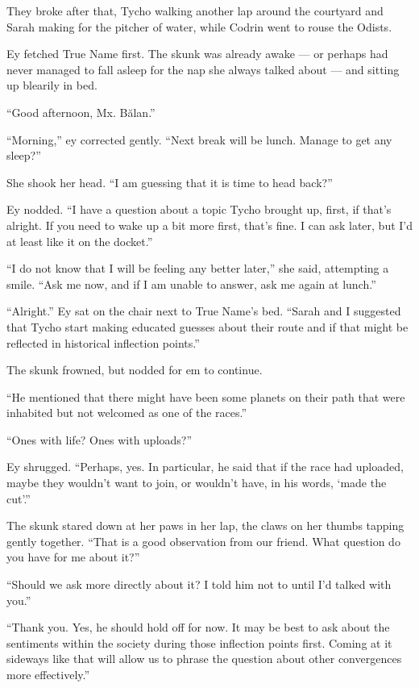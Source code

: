 They broke after that, Tycho walking another lap around the courtyard and Sarah making for the pitcher of water, while Codrin went to rouse the Odists.

Ey fetched True Name first. The skunk was already awake — or perhaps had never managed to fall asleep for the nap she always talked about — and sitting up blearily in bed.

``Good afternoon, Mx. Bălan.''

``Morning,'' ey corrected gently. ``Next break will be lunch. Manage to get any sleep?''

She shook her head. ``I am guessing that it is time to head back?''

Ey nodded. ``I have a question about a topic Tycho brought up, first, if that's alright. If you need to wake up a bit more first, that's fine. I can ask later, but I'd at least like it on the docket.''

``I do not know that I will be feeling any better later,'' she said, attempting a smile. ``Ask me now, and if I am unable to answer, ask me again at lunch.''

``Alright.'' Ey sat on the chair next to True Name's bed. ``Sarah and I suggested that Tycho start making educated guesses about their route and if that might be reflected in historical inflection points.''

The skunk frowned, but nodded for em to continue.

``He mentioned that there might have been some planets on their path that were inhabited but not welcomed as one of the races.''

``Ones with life? Ones with uploads?''

Ey shrugged. ``Perhaps, yes. In particular, he said that if the race had uploaded, maybe they wouldn't want to join, or wouldn't have, in his words, `made the cut'.''

The skunk stared down at her paws in her lap, the claws on her thumbs tapping gently together. ``That is a good observation from our friend. What question do you have for me about it?''

``Should we ask more directly about it? I told him not to until I'd talked with you.''

``Thank you. Yes, he should hold off for now. It may be best to ask about the sentiments within the society during those inflection points first. Coming at it sideways like that will allow us to phrase the question about other convergences more effectively.''

